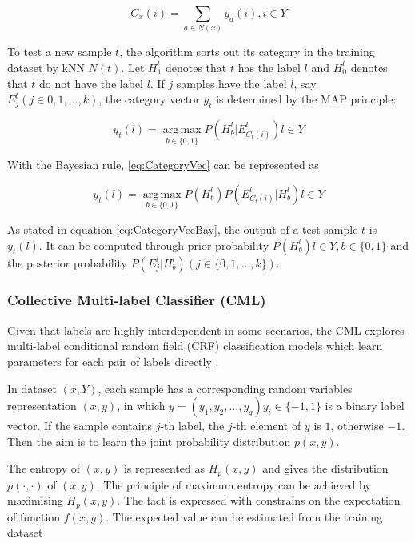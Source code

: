 \begin{equation}\label{eq:KNNCounting}
C_{x}(i) = \sum_{a \in N(x)} y_{a}(i), i \in Y
\end{equation}

To test a new sample $t$, the algorithm sorts out its category in the training dataset by kNN $N(t)$. Let $H_{1}^l$ denotes that $t$ has the label $l$ and $H_{0}^l$ denotes that $t$ do not have the label $l$. If $j$ samples have the label $l$, say $E_{j}^l (j \in {0,1,...,k})$, the category vector $y_{t}$ is determined by the MAP principle:

\begin{equation}\label{eq:CategoryVec}
y_{t}(l) = \operatorname*{arg\,max}_{b \in \{0,1\}} P(H_{b}^l|E_{C_{t}(i) }^l) l \in Y
\end{equation}

With the Bayesian rule, \ref{eq:CategoryVec} can be represented as

\begin{equation}\label{eq:CategoryVecBay}
y_{t}(l) = \operatorname*{arg\,max}_{b \in \{0,1\}} P(H_{b}^l)P(E_{C_{t}(i) }^l|H_{b}^l) l \in Y
\end{equation}

As stated in equation \ref{eq:CategoryVecBay}, the output of a test sample $t$ is $y_{t}(l)$. It can be computed through prior probability $P(H_{b}^l) l \in Y, b \in \{0,1\}$ and the posterior probability $P(E_{j}^l|H_{b}^l) (j \in \{0,1,...,k\})$.

\subsubsection{Collective Multi-label Classifier (CML)}

Given that labels are highly interdependent in some scenarios, the CML explores multi-label conditional random field (CRF) classification models which learn  parameters for each pair of labels directly \citep{ghamrawi2005collective}.

In dataset $(x,Y)$, each sample has a corresponding random variables representation $(x,y)$, in which $y = (y_{1},y_{2},...,y_{q})  y_{i} \in \{-1,1\}$ is a binary label vector. If the sample contains $j$-th label, the $j$-th element of $y$ is $1$, otherwise $-1$. Then the aim is to learn the joint probability distribution $p(x,y)$.

The entropy of $(x,y)$ is represented as $H_{p}(x,y)$ and gives the distribution $p(\cdot,\cdot)$ of $(x,y)$. The principle of maximum entropy can be achieved by maximising $H_{p}(x,y)$. The fact is expressed with constrains on the expectation of function $f(x,y)$. The expected value can be estimated from the training dataset

